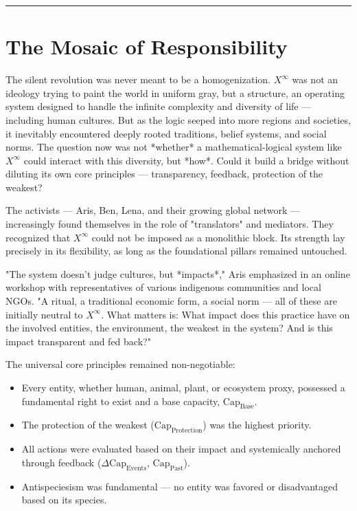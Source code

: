 \documentclass[12pt, english, parskip=full]{scrartcl} %
\begin{document}
\noindent\rule{\linewidth}{0.4pt}

\section{The Mosaic of Responsibility}
The silent revolution was never meant to be a homogenization. $X^{\infty}$ was not an ideology trying to paint the world in uniform gray, but a structure, an operating system designed to handle the infinite complexity and diversity of life — including human cultures. But as the logic seeped into more regions and societies, it inevitably encountered deeply rooted traditions, belief systems, and social norms. The question now was not *whether* a mathematical-logical system like $X^{\infty}$ could interact with this diversity, but *how*. Could it build a bridge without diluting its own core principles — transparency, feedback, protection of the weakest?

The activists — Aris, Ben, Lena, and their growing global network — increasingly found themselves in the role of "translators" and mediators. They recognized that $X^{\infty}$ could not be imposed as a monolithic block. Its strength lay precisely in its flexibility, as long as the foundational pillars remained untouched.

"The system doesn’t judge cultures, but *impacts*," Aris emphasized in an online workshop with representatives of various indigenous communities and local NGOs. "A ritual, a traditional economic form, a social norm — all of these are initially neutral to $X^{\infty}$. What matters is: What impact does this practice have on the involved entities, the environment, the weakest in the system? And is this impact transparent and fed back?"

The universal core principles remained non-negotiable:
\begin{itemize}
    \item Every entity, whether human, animal, plant, or ecosystem proxy, possessed a fundamental right to exist and a base capacity, $\text{Cap}_{\text{Base}}$.
    \item The protection of the weakest ($\text{Cap}_{\text{Protection}}$) was the highest priority.
    \item All actions were evaluated based on their impact and systemically anchored through feedback ($\Delta \text{Cap}_{\text{Events}}$, $\text{Cap}_{\text{Past}}$).
    \item Antispeciesism was fundamental — no entity was favored or disadvantaged based on its species.
\end{itemize}
\end{document}
